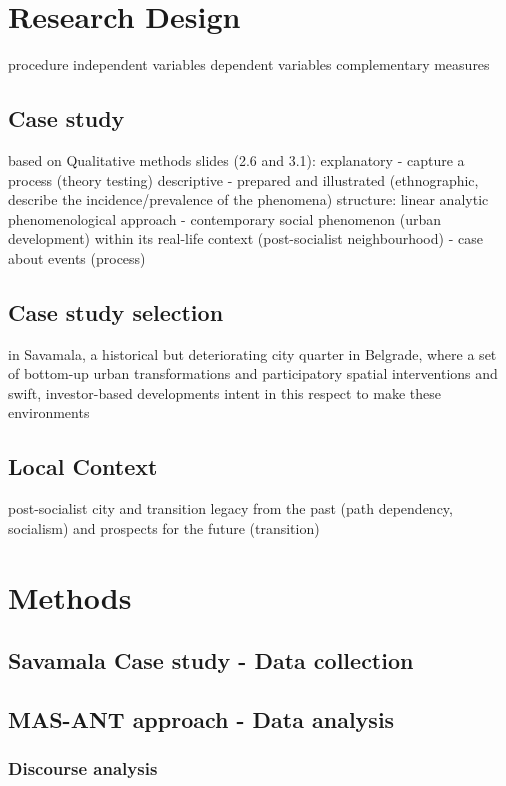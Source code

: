 \documentclass[11pt]{report}
\begin{document}
\section{Research Design}

procedure
independent variables
dependent variables
complementary measures

\subsection{Case study}

based on Qualitative methods slides (2.6 and 3.1):
explanatory - capture a process (theory testing)
descriptive - prepared and illustrated (ethnographic, describe the incidence/prevalence of the phenomena)
structure: linear analytic
phenomenological approach - contemporary social phenomenon (urban development) within its real-life context (post-socialist neighbourhood) - case about events (process)


\subsection{Case study selection}
in Savamala, a historical but deteriorating city quarter in Belgrade, where a set of bottom-up urban transformations and participatory spatial interventions and swift, investor-based developments intent in this respect to make these environments 
\subsection{Local Context}

post-socialist city and transition
legacy from the past (path dependency, socialism) and prospects for the future (transition)

\section{Methods}

\subsection{Savamala Case study - Data collection} \label{sec:predis}

\subsection{MAS-ANT approach - Data analysis}

\subsubsection{Discourse analysis}
\end{document}
